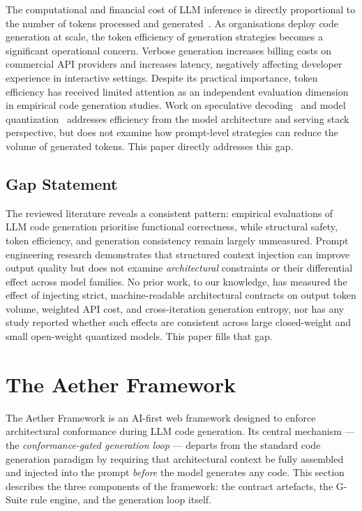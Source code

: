 \documentclass[review,12pt,3p]{elsarticle}
\begin{document}
The computational and financial cost of LLM inference is directly proportional to the
number of tokens processed and generated~\citep{Sharir2020CostNLP}. As organisations
deploy code generation at scale, the token efficiency of generation strategies becomes
a significant operational concern. Verbose generation increases billing costs on commercial
API providers and increases latency, negatively affecting developer experience in interactive
settings. Despite its practical importance, token efficiency has received limited attention
as an independent evaluation dimension in empirical code generation studies. Work on
speculative decoding~\citep{Leviathan2023Speculative} and model quantization~\citep{Dettmers2022LLMInt8}
addresses efficiency from the model architecture and serving stack perspective, but does not
examine how prompt-level strategies can reduce the volume of generated tokens. This paper
directly addresses this gap.

\subsection{Gap Statement}

The reviewed literature reveals a consistent pattern: empirical evaluations of LLM code
generation prioritise functional correctness, while structural safety, token efficiency, and
generation consistency remain largely unmeasured. Prompt engineering research demonstrates
that structured context injection can improve output quality but does not examine
\emph{architectural} constraints or their differential effect across model families. No
prior work, to our knowledge, has measured the effect of injecting strict, machine-readable
architectural contracts on output token volume, weighted API cost, and cross-iteration
generation entropy, nor has any study reported whether such effects are consistent across
large closed-weight and small open-weight quantized models. This paper fills that gap.

\section{The Aether Framework}
\label{sec:framework}

The Aether Framework is an AI-first web framework designed to enforce architectural
conformance during LLM code generation. Its central mechanism --- the
\emph{conformance-gated generation loop} --- departs from the standard code generation
paradigm by requiring that architectural context be fully assembled and injected into the
prompt \emph{before} the model generates any code. This section describes the three
components of the framework: the contract artefacts, the G-Suite rule engine, and the
generation loop itself.
\end{document}

